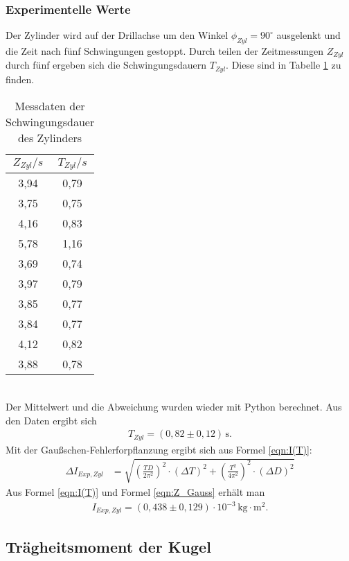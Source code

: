 \subsubsection{Experimentelle Werte}
Der Zylinder wird auf der Drillachse um den Winkel $\phi_{Zyl} = 90^{\circ}$ ausgelenkt und die Zeit
nach fünf Schwingungen gestoppt.
Durch teilen der Zeitmessungen $Z_{Zyl}$ durch fünf ergeben sich die Schwingungsdauern $T_{Zyl}$. 
Diese sind in Tabelle \ref{tab:T_Zyl} zu finden.
\begin{table}
  \centering
  \caption{Messdaten der Schwingungsdauer des Zylinders}
  \label{tab:T_Zyl}
  \begin{tabular}{c c}
    \toprule
    $Z_{Zyl}/s$ & $T_{Zyl}/s$ \\
    \midrule
    3,94 & 0,79 \\
    3,75 & 0,75 \\
    4,16 & 0,83 \\
    5,78 & 1,16 \\
    3,69 & 0,74 \\
    3,97 & 0,79 \\
    3,85 & 0,77 \\
    3,84 & 0,77 \\
    4,12 & 0,82 \\
    3,88 & 0,78 \\
    \bottomrule
  \end{tabular}
\end{table}
\\
Der Mittelwert und die Abweichung wurden wieder mit Python berechnet.
Aus den Daten ergibt sich
\begin{align*}
  T_{Zyl} = (0{,}82 \pm 0{,}12)\, \mathrm{s} .
\end{align*}
Mit der Gaußschen-Fehlerforpflanzung ergibt sich aus Formel \ref{eqn:I(T)}:
\begin{align}
  \label{eqn:Z_Gauss}
  \Delta I_{Exp, Zyl} &= \sqrt{\left(\frac{TD}{2\pi^2}\right)^2 \cdot (\Delta T)^2 + \left(\frac{T^2}{4\pi^2} \right)^2 \cdot (\Delta D)^2}
\end{align}
Aus Formel \ref{eqn:I(T)} und Formel \ref{eqn:Z_Gauss} erhält man
\begin{align*}
  I_{Exp, Zyl} = (0{,}438 \pm 0{,}129)\cdot 10^{-3}\, \mathrm{kg \cdot m^2}.
\end{align*}

\subsection{Trägheitsmoment der Kugel}

